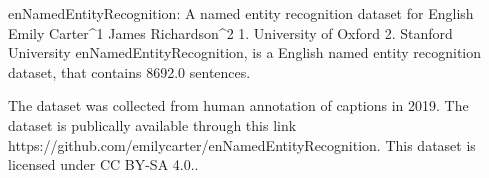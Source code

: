 
enNamedEntityRecognition: A named entity recognition dataset for English
Emily Carter^1 James Richardson^2
1. University of Oxford 2. Stanford University
enNamedEntityRecognition, is a English named entity recognition dataset, that contains 8692.0 sentences.

The dataset was collected from human annotation of captions in 2019. 
The dataset is publically available through this link https://github.com/emilycarter/enNamedEntityRecognition. This dataset is licensed under CC BY-SA 4.0..

